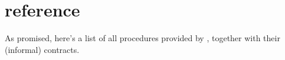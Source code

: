 
\chapter{ reference}
\label{cha:scmf-task-refer}

As promised, here's a list of all procedures provided by
, together with their (informal) contracts.


